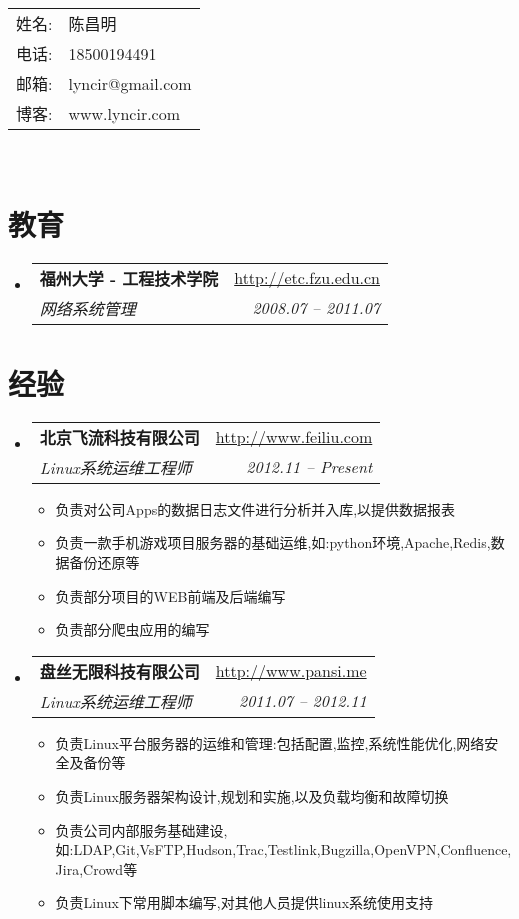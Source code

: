\documentclass[11pt,letterpaper]{article}
\makeatletter
\newcommand{\resitem}[1]{\item #1 \vspace{-2pt}}
\newcommand{\ressubheading}[4]{
\begin{tabular*}{6.5in}{l@{\extracolsep{\fill}}r}
	\textbf{#1} & \url{#2} \\
	\textit{#3} & \textit{#4} \\
\end{tabular*}\vspace{-6pt}}
\makeatother
\begin{document}
\begin{CJK}{UTF8}{gbsn}

\begin{tabular}{p{1.2cm}l}
	姓名: & 陈昌明 \\
	电话: & 18500194491 \\
	邮箱: & lyncir@gmail.com \\
	博客: & www.lyncir.com \\
\end{tabular}
\\
\vspace{0.1in}

\section{教育}  
	\begin{itemize}
	 	\item    
			\ressubheading{福州大学 - 工程技术学院}{http://etc.fzu.edu.cn}{网络系统管理}{2008.07 -- 2011.07}
	\end{itemize}

\section {经验}   
	\begin{itemize}
		\item 
			\ressubheading{北京飞流科技有限公司}{http://www.feiliu.com}{Linux系统运维工程师}{2012.11 -- Present}
				{ \footnotesize
				\begin{itemize}
						\resitem{负责对公司Apps的数据日志文件进行分析并入库,以提供数据报表}
						\resitem{负责一款手机游戏项目服务器的基础运维,如:python环境,Apache,Redis,数据备份还原等}
						\resitem{负责部分项目的WEB前端及后端编写}
						\resitem{负责部分爬虫应用的编写}
				\end{itemize}
			 	}     
		\item 
			\ressubheading{盘丝无限科技有限公司}{http://www.pansi.me}{Linux系统运维工程师}{2011.07 -- 2012.11}
				{ \footnotesize
				\begin{itemize}
						\resitem{负责Linux平台服务器的运维和管理:包括配置,监控,系统性能优化,网络安全及备份等}
						\resitem{负责Linux服务器架构设计,规划和实施,以及负载均衡和故障切换}
						\resitem{负责公司内部服务基础建设,如:LDAP,Git,VsFTP,Hudson,Trac,Testlink,Bugzilla,OpenVPN,Confluence,Jira,Crowd等}
						\resitem{负责Linux下常用脚本编写,对其他人员提供linux系统使用支持}
				\end{itemize}
			 	}     
	\end{itemize}


\end{CJK}
\end{document}
